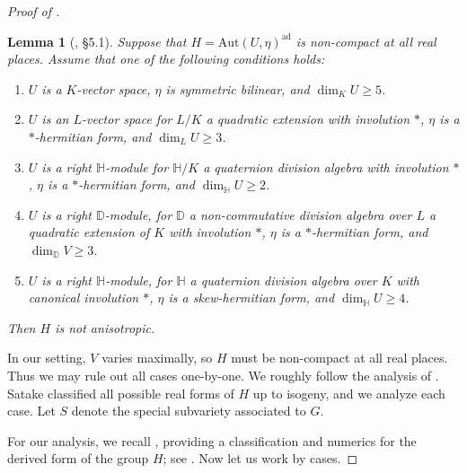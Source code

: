 \documentclass[12pt]{amsart}
\newcommand{\Aut}{\mathrm{Aut}}
\newtheorem{lemma}[theorem]{Lemma}
\theoremstyle{definition}
\numberwithin{equation}{section}
\begin{document}
\begin{proof}[Proof of ]
\begin{lemma}[\cite{grushevsky-mondello-manni-tsimerman25}, \S 5.1] \label{anisotropic-rep-classification}
    Suppose that \(H = \Aut(U, \eta)^\mathrm{ad}\) is non-compact at all real places. 
    Assume that one of the following conditions holds:
    \begin{enumerate}
    \item[(q)] \(U\) is a \(K\)-vector space, \(\eta\) is symmetric bilinear, 
        and \(\dim_K U \geq 5\). 
    \item[(uF)] \(U\) is an \(L\)-vector space for \(L/K\) a quadratic extension 
        with involution \(*\), \(\eta\) is a \(*\)-hermitian form, and \(\dim_L U \geq 3\).
    \item[(uH)] \(U\) is a right \(\mathbb{H}\)-module for \(\mathbb{H}/K\) a quaternion 
        division algebra with involution \(*\), \(\eta\) is a \(*\)-hermitian form, and 
        \(\dim_\mathbb{H} U \geq 2\).
    \item[(uD)] \(U\) is a right \(\mathbb{D}\)-module, for \(\mathbb{D}\) a non-commutative
        division algebra over \(L\) a quadratic extension of \(K\) with involution \(*\),
        \(\eta\) is a \(*\)-hermitian form, and \(\dim_\mathbb{D} V \geq 3\).
    \item[(skH)] \(U\) is a right \(\mathbb{H}\)-module, for \(\mathbb{H}\) a 
        quaternion division algebra over \(K\) with canonical involution \(*\), 
        \(\eta\) is a skew-hermitian form, and \(\dim_{\mathbb{H}} U \geq 4\).
    \end{enumerate}
    Then \(H\) is not anisotropic.
\end{lemma}

In our setting, \(V\) varies maximally, so \(H\) must be non-compact at all real places. 
Thus we may rule out all cases one-by-one. We roughly follow the analysis of 
\cite[\S 7.2]{grushevsky-mondello-manni-tsimerman25}. Satake classified all possible 
real forms of \(H\) up to isogeny, and we analyze each case. Let \(S\) denote the 
special subvariety associated to \(G\). 

For our analysis, we recall \cite[Table 3]{grushevsky-mondello-manni-tsimerman25},
providing a classification and numerics for the derived form of the group \(H\); 
see . Now let us work by cases.


\end{proof}
\end{document}
